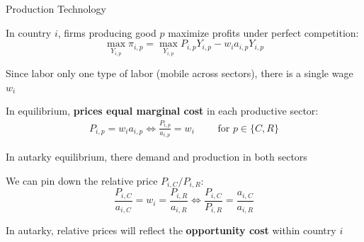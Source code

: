 \documentclass[notes,11pt, aspectratio=169, xcolor=table]{beamer}
\newenvironment{wideitemize}{\itemize\addtolength{\itemsep}{10pt}}{\enditemize}
\begin{document}
\begin{frame}{Production Technology}
\begin{wideitemize}
        \item In country $i$, firms producing good $p$ maximize profits under perfect competition:
        \begin{equation*}
            \max_{Y_{i,p}} \pi_{i,p} = \max_{Y_{i,p}} P_{i,p}Y_{i,p} - w_i a_{i,p} Y_{i,p} 
        \end{equation*}
        \item<2-> Since labor only one type of labor (mobile across sectors), there is a single wage $w_i$
        \item<3-> In equilibrium, \textbf{prices equal marginal cost} in each productive sector:
        \begin{eqnarray*}
            P_{i,p} = w_i a_{i,p} \iff \frac{P_{i,p}}{a_{i,p}} = w_i  \qquad \text{ for } p \in\{C,R\}
        \end{eqnarray*}
        \item<4-> In autarky equilibrium, there demand and production in both sectors
        \item<5-> We can pin down the relative price $P_{i,C} / P_{i,R}$:
        \begin{equation*}
            \frac{P_{i,C}}{a_{i,C}} = w_i = \frac{P_{i,R}}{a_{i,R}} \iff \frac{P_{i,C}}{P_{i,R}} = \frac{a_{i,C}}{a_{i,R}}  
        \end{equation*}
    \item<6-> In autarky, relative prices will reflect the \textbf{opportunity cost} within country $i$
    \end{wideitemize}
\end{frame}
\end{document}
